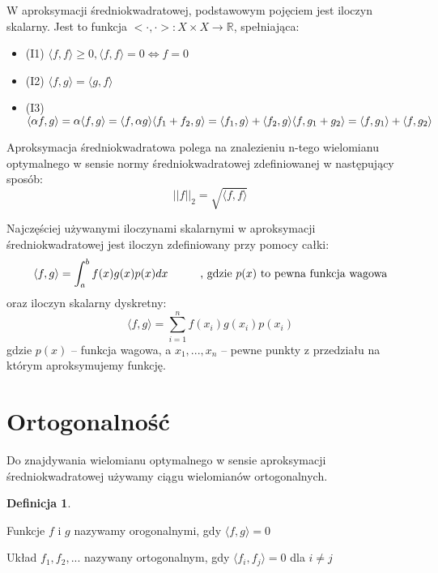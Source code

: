 \documentclass[a4paper]{article}
\theoremstyle{definition}
\newtheorem*{definition}{Definicja}
\theoremstyle{theorem}
\begin{document}
W aproksymacji średniokwadratowej, podstawowym pojęciem jest iloczyn skalarny.
Jest to funkcja $ <\cdot, \cdot>: X \times X \rightarrow \mathbb R$, spełniająca:
\begin{center}
\begin{minipage}{0.5\textwidth}
\begin {itemize}
\item[(I1)] $ \langle f, f\rangle  \ge 0, \langle f, f\rangle  = 0 \iff f = 0 $
\item[(I2)] $ \langle f, g\rangle  = \langle g, f\rangle  $
\item[(I3)] $ \langle \alpha f, g\rangle  = \alpha\langle f, g\rangle  = \langle f, \alpha g\rangle  \\
              \langle f_1 + f_2, g\rangle  = \langle f_1, g\rangle  + \langle f_2, g\rangle  \\
              \langle f, g_1 + g_2\rangle  = \langle f, g_1\rangle  + \langle f, g_2\rangle $
\end{itemize}
\end{minipage}
\end{center}

Aproksymacja średniokwadratowa polega na znalezieniu n-tego wielomianu optymalnego
w sensie normy średniokwadratowej zdefiniowanej w następujący sposób:
$$ ||f||_2 = \sqrt{\langle f, f \rangle} $$

Najczęściej używanymi iloczynami skalarnymi w aproksymacji średniokwadratowej jest
iloczyn zdefiniowany przy pomocy całki:
$$ \langle f, g \rangle = \int_a^bf(x)g(x)p(x)dx \text{\hspace{1cm}, gdzie $p(x)$
to pewna funkcja wagowa}$$
oraz iloczyn skalarny dyskretny:
$$ \langle f, g \rangle = \sum_{i=1}^nf(x_i)g(x_i)p(x_i) $$
gdzie $p(x)$ -- funkcja wagowa, a $x_1, ..., x_n$ -- pewne punkty z przedziału 
na którym aproksymujemy funkcję.

\newpage
\section{Ortogonalność}
Do znajdywania wielomianu optymalnego w sensie aproksymacji średniokwadratowej 
używamy ciągu wielomianów ortogonalnych. 

\begin{definition}~

  Funkcje $f$ i $g$ nazywamy orogonalnymi, gdy $\langle f, g\rangle = 0$

  Układ ${f_1, f_2, ...}$ nazywany ortogonalnym, gdy $\langle f_i, f_j\rangle = 0$
  dla $i \neq j$
\end{definition}
\end{document}
